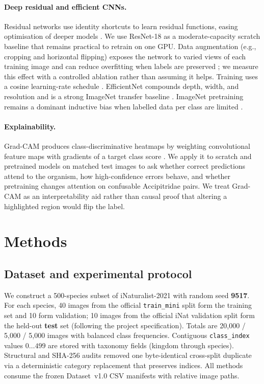 \documentclass[10pt,twocolumn,letterpaper]{article}
\begin{document}
\paragraph{Deep residual and efficient CNNs.}
Residual networks use identity shortcuts to learn residual functions, easing
optimisation of deeper models \cite{he2016deep}. We use ResNet-18 as a
moderate-capacity scratch baseline that remains practical to retrain on one
GPU. Data augmentation (e.g., cropping and horizontal flipping) exposes the
network to varied views of each training image and can reduce overfitting when
labels are preserved \cite{shorten2019augmentation}; we measure this effect
with a controlled ablation rather than assuming it helps. Training uses a
cosine learning-rate schedule \cite{loshchilov2017sgdr}. EfficientNet compounds
depth, width, and resolution and is a strong ImageNet transfer baseline
\cite{tan2019efficientnet}. ImageNet pretraining remains a dominant inductive
bias when labelled data per class are limited \cite{krizhevsky2012imagenet}.

\paragraph{Explainability.}
Grad-CAM produces class-discriminative heatmaps by weighting convolutional
feature maps with gradients of a target class score
\cite{selvaraju2017gradcam}. We apply it to scratch and pretrained models on
matched test images to ask whether correct predictions attend to the organism,
how high-confidence errors behave, and whether pretraining changes attention
on confusable Accipitridae pairs. We treat Grad-CAM as an interpretability aid
rather than causal proof that altering a highlighted region would flip the
label.

\section{Methods}

\subsection{Dataset and experimental protocol}
\label{sec:data}

We construct a 500-species subset of iNaturalist-2021 with random seed
\textbf{9517}. For each species, 40 images from the official \texttt{train\_mini}
split form the training set and 10 form validation; 10 images from the
official iNat validation split form the held-out \textbf{test} set (following
the project specification). Totals are 20{,}000 / 5{,}000 / 5{,}000 images with
balanced class frequencies. Contiguous \texttt{class\_index} values $0\ldots499$
are stored with taxonomy fields (kingdom through species). Structural and
SHA-256 audits removed one byte-identical cross-split duplicate via a
deterministic category replacement that preserves indices. All methods consume
the frozen Dataset~v1.0 CSV manifests with relative image paths.
\end{document}
